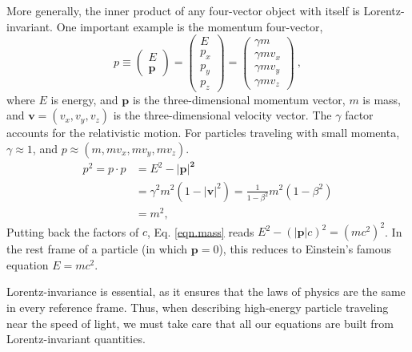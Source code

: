 More generally, the inner product of any four-vector object with itself is Lorentz-invariant. One important example is the momentum four-vector,
\begin{equation}
    p \equiv \begin{pmatrix}
        E \\
        \mathbf{p}
    \end{pmatrix}
    = \begin{pmatrix}
        E \\
        p_x \\
        p_y \\
        p_z
    \end{pmatrix}
    = \begin{pmatrix}
        \gamma m \\
        \gamma m v_x \\
        \gamma m v_y \\
        \gamma m v_z
    \end{pmatrix}\ , \label{eqn.four_momentum}
\end{equation}
where $E$ is energy, and $\mathbf{p}$ is the three-dimensional momentum vector, $m$ is mass, and $\mathbf{v}=(v_x,v_y,v_z)$ is the three-dimensional velocity vector. The $\gamma$ factor accounts for the relativistic motion. For particles traveling with small momenta, $\gamma\approx 1$, and $p\approx(m, mv_x,mv_y,mv_z)$.
\begin{equation}
\begin{aligned}
    p^2 = p \cdot p &= E^2-|\mathbf{p|^2} \\
    &=  \gamma^2m^2(1-|\mathbf{v}|^2) = \frac{1}{1-\beta^2}m^2(1-\beta^2) \\
    &= m^2,
    \label{eqn.mass}
\end{aligned}
\end{equation}
Putting back the factors of $c$, Eq. \eqref{eqn.mass} reads $E^2-(|\mathbf{p}|c)^2 = (mc^2)^2$. In the rest frame of a particle (in which $\mathbf{p}=0$), this reduces to Einstein's famous equation $E=mc^2$. 

Lorentz-invariance is essential, as it ensures that the laws of physics are the same in every reference frame. Thus, when describing high-energy particle traveling near the speed of light, we must take care that all our equations are built from Lorentz-invariant quantities.

